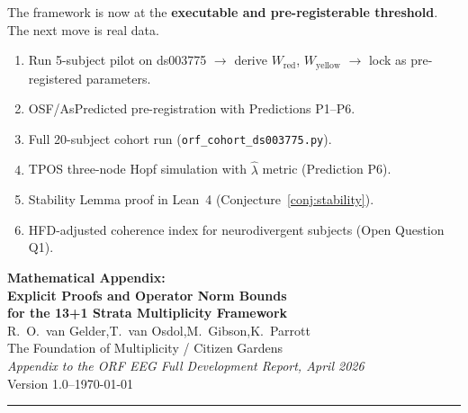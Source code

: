 \documentclass[12pt,a4paper]{article}
\theoremstyle{plain}
\theoremstyle{definition}
\newcommand{\hatlambda}{\hat{\lambda}}
\begin{document}
The framework is now at the \textbf{executable and pre-registerable threshold}.
The next move is real data.

\bigskip
\begin{tcolorbox}[colback=boxbg, colframe=boxborder,
  title={\bfseries Immediate Next Steps (April 2026)}]
  \begin{enumerate}[leftmargin=1.5em, itemsep=2pt]
    \item Run 5-subject pilot on ds003775 $\to$ derive $W_{\mathrm{red}}$, $W_{\mathrm{yellow}}$
          $\to$ lock as pre-registered parameters.
    \item OSF/AsPredicted pre-registration with Predictions P1--P6.
    \item Full 20-subject cohort run (\texttt{orf\_cohort\_ds003775.py}).
    \item TPOS three-node Hopf simulation with $\hatlambda$ metric (Prediction P6).
    \item Stability Lemma proof in Lean~4 (Conjecture~\ref{conj:stability}).
    \item HFD-adjusted coherence index for neurodivergent subjects (Open Question Q1).
  \end{enumerate}
\end{tcolorbox}

\begin{center}
  {\LARGE\bfseries\color{mpblue}
    Mathematical Appendix:\\[4pt]
    Explicit Proofs and Operator Norm Bounds\\[4pt]
    for the 13+1 Strata Multiplicity Framework}\\[1.2em]
  {\large R.\ O.\ van Gelder,\quad T.\ van Osdol,\quad M.\ Gibson,\quad K.\ Parrott}\\[0.4em]
  {\normalsize The Foundation of Multiplicity / Citizen Gardens}\\[0.4em]
  {\normalsize\textit{Appendix to the ORF EEG Full Development Report, April 2026}}\\[0.4em]
  {\small Version 1.0\quad--\quad\today}
\end{center}

\vspace{0.5em}
\noindent\rule{\linewidth}{1.2pt}
\vspace{0.3em}
\end{document}
